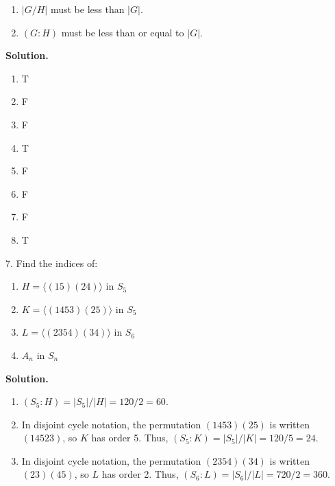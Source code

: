 \documentclass[10pt,]{book}
\theoremstyle{plain}
\theoremstyle{definition}
\theoremstyle{definition}
\theoremstyle{definition}
\theoremstyle{definition}
\numberwithin{equation}{section}
\begin{document}
\begin{exerciselist}
\begin{enumerate}[label=(\alph*)]
\item\hypertarget{li-470}{}\(|G/H|\) must be less than \(|G|\).%
\item\hypertarget{li-471}{}\((G:H)\) must be less than or equal to \(|G|\).%
\end{enumerate}
%
\par\smallskip
\par\smallskip
\noindent\textbf{Solution.}\hypertarget{solution-55}{}\quad
\leavevmode%
\begin{multicols}{4}
\begin{enumerate}[label=(\alph*)]
\item\hypertarget{li-472}{}T%
\item\hypertarget{li-473}{}F%
\item\hypertarget{li-474}{}F%
\item\hypertarget{li-475}{}T%
\item\hypertarget{li-476}{}F%
\item\hypertarget{li-477}{}F%
\item\hypertarget{li-478}{}F%
\item\hypertarget{li-479}{}T%
\end{enumerate}
\end{multicols}
\item[7.]\hypertarget{exercise-56}{}Find the indices of: \leavevmode%
\begin{enumerate}[label=(\alph*)]
\item\hypertarget{li-480}{}\(H=\langle (15)(24)\rangle\) in \(S_5\)%
\item\hypertarget{li-481}{}\(K=\langle (1453)(25)\rangle\) in \(S_5\)%
\item\hypertarget{li-482}{}\(L=\langle (2354)(34)\rangle\) in \(S_6\)%
\item\hypertarget{li-483}{}\(A_n\) in \(S_n\)%
\end{enumerate}
%
\par\smallskip
\par\smallskip
\noindent\textbf{Solution.}\hypertarget{solution-56}{}\quad
\leavevmode%
\begin{enumerate}[label=(\alph*)]
\item\hypertarget{li-484}{}\((S_5:H)=|S_5|/|H|=120/2=60.\)%
\item\hypertarget{li-485}{}In disjoint cycle notation, the permutation \((1453)(25)\) is written \((14523)\), so \(K\) has order 5. Thus, \((S_5:K)=|S_5|/|K|=120/5=24.\)%
\item\hypertarget{li-486}{}In disjoint cycle notation, the permutation \((2354)(34)\) is written \((23)(45)\), so \(L\) has order 2. Thus, \((S_6:L)=|S_6|/|L|=720/2=360.\)%

\end{enumerate}
\end{exerciselist}
\end{document}
